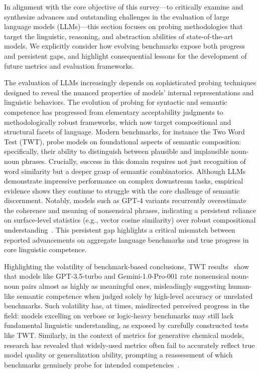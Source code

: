 \documentclass[sigconf]{acmart}
\begin{document}
In alignment with the core objective of this survey---to critically examine and synthesize advances and outstanding challenges in the evaluation of large language models (LLMs)---this section focuses on probing methodologies that target the linguistic, reasoning, and abstraction abilities of state-of-the-art models. We explicitly consider how evolving benchmarks expose both progress and persistent gaps, and highlight consequential lessons for the development of future metrics and evaluation frameworks.

The evaluation of LLMs increasingly depends on sophisticated probing techniques designed to reveal the nuanced properties of models' internal representations and linguistic behaviors. The evolution of probing for syntactic and semantic competence has progressed from elementary acceptability judgments to methodologically robust frameworks, which now target compositional and structural facets of language. Modern benchmarks, for instance the Two Word Test (TWT), probe models on foundational aspects of semantic composition: specifically, their ability to distinguish between plausible and implausible noun-noun phrases. Crucially, success in this domain requires not just recognition of word similarity but a deeper grasp of semantic combinatorics. Although LLMs demonstrate impressive performance on complex downstream tasks, empirical evidence shows they continue to struggle with the core challenge of semantic discernment. Notably, models such as GPT-4 variants recurrently overestimate the coherence and meaning of nonsensical phrases, indicating a persistent reliance on surface-level statistics (e.g., vector cosine similarity) over robust compositional understanding~\cite{ref96}. This persistent gap highlights a critical mismatch between reported advancements on aggregate language benchmarks and true progress in core linguistic competence.

Highlighting the volatility of benchmark-based conclusions, TWT results~\cite{ref96} show that models like GPT-3.5-turbo and Gemini-1.0-Pro-001 rate nonsensical noun-noun pairs almost as highly as meaningful ones, misleadingly suggesting human-like semantic competence when judged solely by high-level accuracy or unrelated benchmarks. Such volatility has, at times, misdirected perceived progress in the field: models excelling on verbose or logic-heavy benchmarks may still lack fundamental linguistic understanding, as exposed by carefully constructed tests like TWT. Similarly, in the context of metrics for generative chemical models, research has revealed that widely-used metrics often fail to accurately reflect true model quality or generalization ability, prompting a reassessment of which benchmarks genuinely probe for intended competencies~\cite{ref91}.
\end{document}
